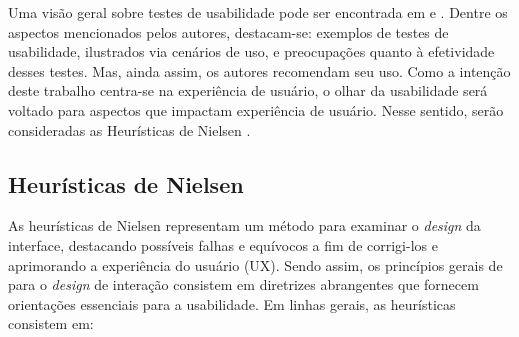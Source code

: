 Uma visão geral sobre testes de usabilidade pode ser encontrada em  e . Dentre os aspectos mencionados pelos autores, destacam-se: exemplos de testes de usabilidade, ilustrados via cenários de uso, e preocupações quanto à efetividade desses testes. Mas, ainda assim, os autores recomendam seu uso. Como a intenção deste trabalho centra-se na experiência de usuário, o olhar da usabilidade será voltado para aspectos que impactam experiência de usuário. Nesse sentido, serão consideradas as Heurísticas de Nielsen \cite{HeuristicasNielsen}.

\subsection{Heurísticas de Nielsen}
\label{HeuristicasNielsen}

As heurísticas de Nielsen representam um método para examinar o \textit{design} da interface, destacando possíveis falhas e equívocos a fim de corrigi-los e aprimorando a experiência do usuário (UX). Sendo assim, os princípios gerais de  para o \textit{design} de interação consistem em diretrizes abrangentes que fornecem orientações essenciais para a usabilidade. Em linhas gerais, as heurísticas consistem em:

